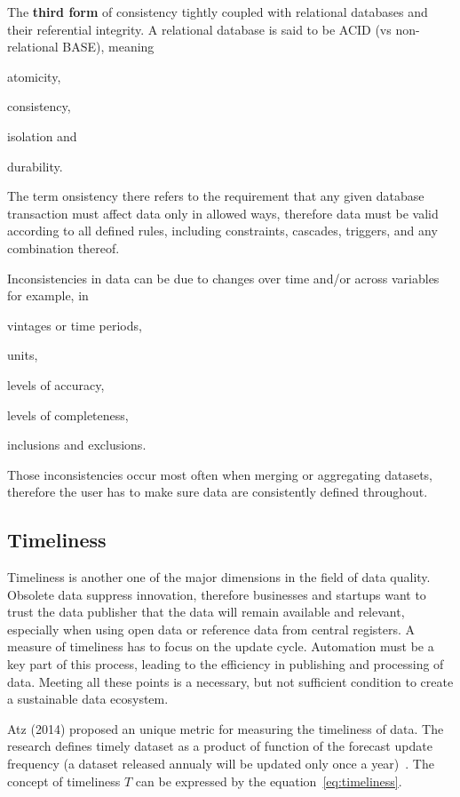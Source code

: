 The \textbf{third form} of consistency tightly coupled with relational databases and their referential integrity.
A relational database is said to be ACID (vs non-relational BASE), meaning
\begin{enumerate*}[label=(\roman*)]
    \item atomicity,
    \item consistency,
    \item isolation and
    \item durability.
\end{enumerate*}
The term onsistency there refers to the requirement that any given database transaction must affect data only in allowed ways, therefore data must be valid according to all defined rules, including constraints, cascades, triggers, and any combination thereof.

Inconsistencies in data can be due to changes over time and/or across variables for example, in
\begin{enumerate*}[label=(\roman*)]
    \item vintages or time periods,
    \item units,
    \item levels of accuracy,
    \item levels of completeness,
    \item inclusions and exclusions.
\end{enumerate*}
Those inconsistencies occur most often when merging or aggregating datasets, therefore the user has to make sure data are consistently defined throughout.

\subsection{Timeliness}

Timeliness is another one of the major dimensions in the field of data quality.
Obsolete data suppress innovation, therefore businesses and startups want to trust the data publisher that the data will remain available and relevant, especially when using open data or reference data from central registers.
A measure of timeliness has to focus on the update cycle.
Automation must be a key part of this process, leading to the efficiency in publishing and processing of data.
Meeting all these points is a necessary, but not sufficient condition to create a sustainable data ecosystem.

Atz (2014) proposed an unique metric for measuring the timeliness of data.
The research defines timely dataset as a product of function of the forecast update frequency (a dataset released annualy will be updated only once a year)~\cite{atz2014tau}.
The concept of timeliness \( T \) can be expressed by the equation~\ref{eq:timeliness}.

